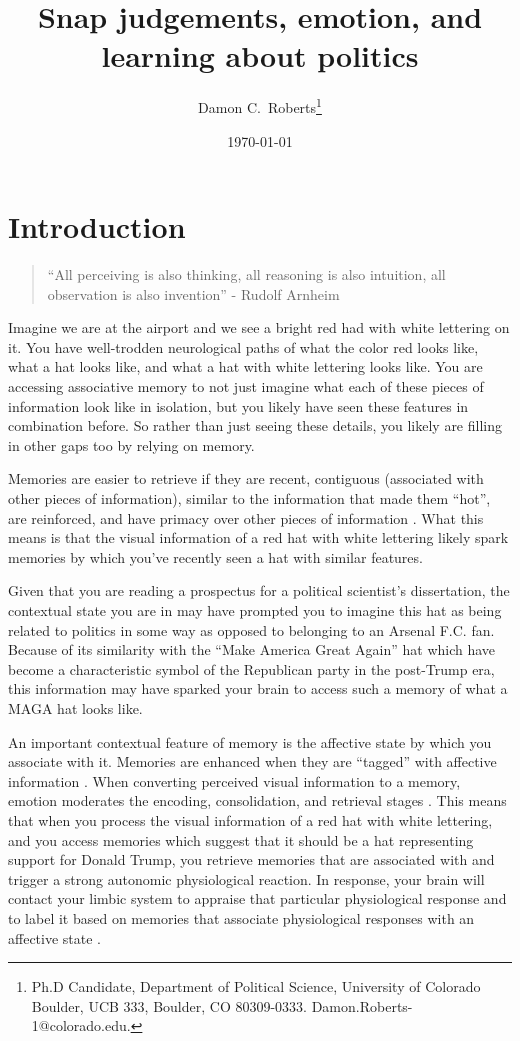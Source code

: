 \documentclass [12pt]{article}
\title{Snap judgements, emotion, and learning about politics}
\author{Damon C.\ Roberts\footnote{Ph.D Candidate,
Department of Political Science, University of Colorado Boulder, UCB 333, Boulder, CO 80309-0333. Damon.Roberts-1@colorado.edu.}}
\date{\today}
\begin{document}
\maketitle


\newpage
\doublespace
\newpage
\section*{Introduction}

\begin{quote}
    ``All perceiving is also thinking, all reasoning is also intuition, all observation is also invention'' - Rudolf Arnheim
\end{quote}

Imagine we are at the airport and we see a bright red had with white lettering on it. You have well-trodden neurological paths of what the color red looks like, what a hat looks like, and what a hat with white lettering looks like. You are accessing associative memory to not just imagine what each of these pieces of information look like in isolation, but you likely have seen these features in combination before. So rather than just seeing these details, you likely are filling in other gaps too by relying on memory.

Memories are easier to retrieve if they are recent, contiguous (associated with other pieces of information), similar to the information that made them ``hot'', are reinforced, and have primacy over other pieces of information \citep{kahana_et-al_2022_ohhum}. What this means is that the visual information of a red hat with white lettering likely spark memories by which you've recently seen a hat with similar features.

Given that you are reading a prospectus for a political scientist's dissertation, the contextual state you are in may have prompted you to imagine this hat as being related to politics in some way as opposed to belonging to an Arsenal F.C. fan. Because of its similarity with the ``Make America Great Again'' hat which have become a characteristic symbol of the Republican party in the post-Trump era, this information may have sparked your brain to access such a memory of what a MAGA hat looks like. 

An important contextual feature of memory is the affective state by which you associate with it. Memories are enhanced when they are ``tagged'' with affective information \citep{kensinger_fields_2022_ohhum}. When converting perceived visual information to a memory, emotion moderates the encoding, consolidation, and retrieval stages \citep{kensinger_fields_2022_ohhum}. This means that when you process the visual information of a red hat with white lettering, and you access memories which suggest that it should be a hat representing support for Donald Trump, you retrieve memories that are associated with and trigger a strong autonomic physiological reaction. In response, your brain will contact your limbic system to appraise that particular physiological response and to label it based on memories that associate physiological responses with an affective state \citep{valentino_et-al_2011_jop}.
\end{document}
